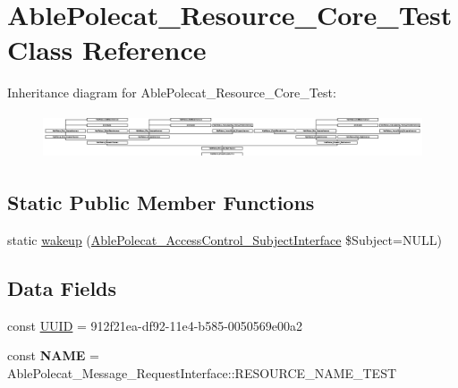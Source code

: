 \hypertarget{class_able_polecat___resource___core___test}{}\section{Able\+Polecat\+\_\+\+Resource\+\_\+\+Core\+\_\+\+Test Class Reference}
\label{class_able_polecat___resource___core___test}
Inheritance diagram for Able\+Polecat\+\_\+\+Resource\+\_\+\+Core\+\_\+\+Test\+:\begin{figure}[H]
\begin{center}
\leavevmode
\includegraphics[height=1.327913cm]{class_able_polecat___resource___core___test}
\end{center}
\end{figure}
\subsection*{Static Public Member Functions}
\begin{DoxyCompactItemize}
\item 
static \hyperlink{class_able_polecat___resource___core___test_a3f2135f6ad45f51d075657f6d20db2cd}{wakeup} (\hyperlink{interface_able_polecat___access_control___subject_interface}{Able\+Polecat\+\_\+\+Access\+Control\+\_\+\+Subject\+Interface} \$Subject=N\+U\+L\+L)
\end{DoxyCompactItemize}
\subsection*{Data Fields}
\begin{DoxyCompactItemize}
\item 
const \hyperlink{class_able_polecat___resource___core___test_a74b892c8c0b86bf9d04c5819898c51e7}{U\+U\+I\+D} = \textquotesingle{}912f21ea-\/df92-\/11e4-\/b585-\/0050569e00a2\textquotesingle{}
\item 
\hypertarget{class_able_polecat___resource___core___test_a244352f035b82b20b0efa506167fd862}{}const {\bfseries N\+A\+M\+E} = Able\+Polecat\+\_\+\+Message\+\_\+\+Request\+Interface\+::\+R\+E\+S\+O\+U\+R\+C\+E\+\_\+\+N\+A\+M\+E\+\_\+\+T\+E\+S\+T\label{class_able_polecat___resource___core___test_a244352f035b82b20b0efa506167fd862}

\end{DoxyCompactItemize}
